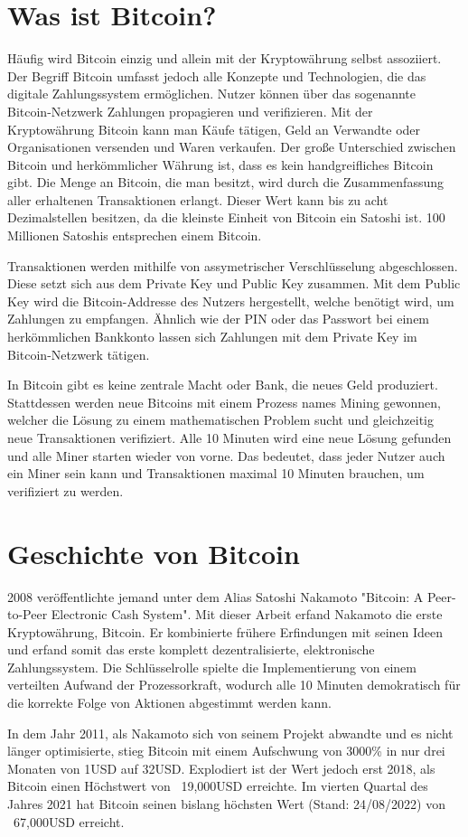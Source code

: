 \section{Was ist Bitcoin?}
Häufig wird Bitcoin einzig und allein mit der Kryptowährung selbst assoziiert. Der Begriff Bitcoin umfasst jedoch alle 
Konzepte und Technologien, die das digitale Zahlungssystem ermöglichen. Nutzer können über das sogenannte Bitcoin-Netzwerk 
Zahlungen propagieren und verifizieren. Mit der Kryptowährung Bitcoin kann man Käufe tätigen, Geld an Verwandte oder
Organisationen versenden und Waren verkaufen. Der große Unterschied zwischen Bitcoin und herkömmlicher Währung ist, dass es 
kein handgreifliches Bitcoin gibt. Die Menge an Bitcoin, die man besitzt, wird durch die Zusammenfassung aller erhaltenen 
Transaktionen erlangt. Dieser Wert kann bis zu acht Dezimalstellen besitzen, da die kleinste Einheit von Bitcoin ein Satoshi
ist. 100 Millionen Satoshis entsprechen einem Bitcoin.

Transaktionen werden mithilfe von assymetrischer Verschlüsselung abgeschlossen. Diese setzt sich aus dem Private Key und Public
Key zusammen. Mit dem Public Key wird die Bitcoin-Addresse des Nutzers hergestellt, welche benötigt wird, um Zahlungen zu
empfangen. Ähnlich wie der PIN oder das Passwort bei einem herkömmlichen Bankkonto lassen sich Zahlungen mit dem Private Key
im Bitcoin-Netzwerk tätigen.

In Bitcoin gibt es keine zentrale Macht oder Bank, die neues Geld produziert. Stattdessen werden neue Bitcoins mit einem Prozess
names Mining gewonnen, welcher die Lösung zu einem mathematischen Problem sucht und gleichzeitig neue Transaktionen verifiziert.
Alle 10 Minuten wird eine neue Lösung gefunden und alle Miner starten wieder von vorne. Das bedeutet, dass jeder Nutzer auch ein
Miner sein kann und Transaktionen maximal 10 Minuten brauchen, um verifiziert zu werden.


\section{Geschichte von Bitcoin}
2008 veröffentlichte jemand unter dem Alias Satoshi Nakamoto "Bitcoin: A Peer-to-Peer Electronic Cash System". Mit dieser Arbeit
erfand Nakamoto die erste Kryptowährung, Bitcoin. Er kombinierte frühere Erfindungen mit seinen Ideen und erfand somit das erste
komplett dezentralisierte, elektronische Zahlungssystem. Die Schlüsselrolle spielte die Implementierung von einem verteilten
Aufwand der Prozessorkraft, wodurch alle 10 Minuten demokratisch für die korrekte Folge von Aktionen abgestimmt werden kann.

In dem Jahr 2011, als Nakamoto sich von seinem Projekt abwandte und es nicht länger optimisierte, stieg Bitcoin mit einem
Aufschwung von 3000\% in nur drei Monaten von 1USD auf 32USD. Explodiert ist der Wert jedoch erst 2018, als Bitcoin einen
Höchstwert von ~19,000USD erreichte. Im vierten Quartal des Jahres 2021 hat Bitcoin seinen bislang höchsten Wert (Stand: 24/08/2022)
von ~67,000USD erreicht.